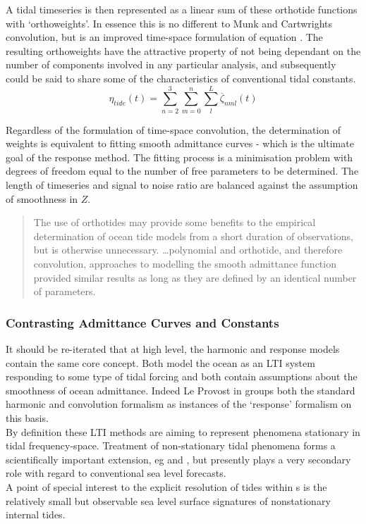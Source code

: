 A tidal timeseries is then represented as a linear sum of these orthotide functions with `orthoweights'. In essence this is no different to Munk and Cartwrights convolution, but is an improved time-space formulation of equation \label{E:Z}.  The resulting orthoweights have the attractive property of not being dependant on the number of components involved in any particular analysis, and subsequently could be said to share some of the characteristics of conventional tidal constants.
\begin{equation}
\label{E:orthosum}
\eta_{tide}(t) = \sum_{n=2}^3 \sum_{m=0}^n \sum_{l}^L \overline{\zeta}_{nml}(t)
\end{equation}

Regardless of the formulation of time-space convolution, the determination of weights is equivalent to fitting smooth admittance curves - which is the ultimate goal of the response method.  The fitting process is a minimisation problem with degrees of freedom equal to the number of free parameters to be determined.    The length of timeseries and signal to noise ratio are balanced against the assumption of smoothness in $Z$.
\begin{quotation}   
The use of orthotides may provide some benefits to the empirical determination of ocean tide models from a short duration of observations, but is otherwise unnecessary. \dots  polynomial and orthotide, and therefore convolution, approaches to modelling the smooth admittance function provided similar results as long as they are defined by an identical number of parameters.\citep{Desai:2006wo}
\end{quotation}



\subsubsection{Contrasting Admittance Curves and Constants}

It should be re-iterated that at high level, the harmonic and response models contain the same core concept.   Both model the ocean as an LTI system responding to some type of tidal forcing and both contain assumptions about the smoothness of ocean admittance.  Indeed Le Provost in \citep[chpt6]{Fu:2001ub} groups both the standard harmonic and convolution formalism as instances of the `response' formalism on this basis. \\
By definition these LTI methods are aiming to represent phenomena stationary in tidal frequency-space.  Treatment of non-stationary tidal phenomena forms a scientifically important extension, eg \citep{Colosi:2006va} and \citep{Ray:2011tj}, but presently plays a very secondary role with regard to conventional sea level forecasts.\\
A point of special interest to the explicit resolution of tides within \OGCM{}s is the relatively small but observable sea level surface signatures of nonstationary internal tides.




